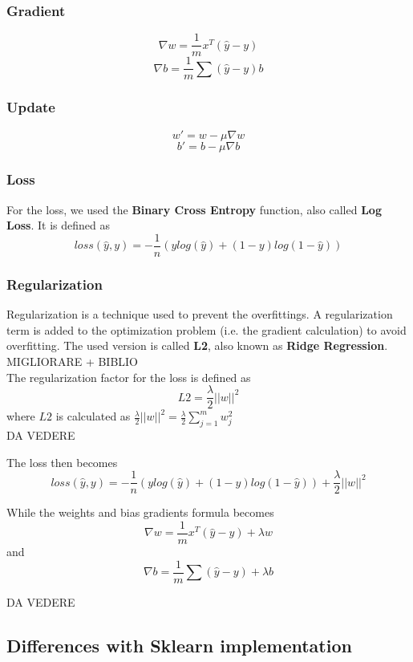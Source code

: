 \documentclass[
	letterpaper, %
	10pt, %
]{class}
\begin{document}
\subsubsection{Gradient}

$$ \nabla w = \frac{1}{m}x^T(\hat{y} - y) $$
$$\nabla b = \frac{1}{m}\sum(\hat{y} - y) b $$

\subsubsection{Update}


$$ w' = w - \mu \nabla w $$
$$ b' = b - \mu \nabla b $$

\subsubsection{Loss}
For the loss, we used the \textbf{Binary Cross Entropy} function, also called \textbf{Log Loss}.
It is defined as
$$ loss(\hat{y}, y) = -\frac{1}{n}(y log(\hat{y}) + (1-y)log(1-\hat{y})) $$

\subsubsection{Regularization}
Regularization is a technique used to prevent the overfittings. A regularization term is added to the optimization problem (i.e. the gradient calculation) to avoid overfitting.
The used version is called \textbf{L2}, also known as \textbf{Ridge Regression}. MIGLIORARE + BIBLIO\\

The regularization factor for the loss is defined as
$$ L2 = \frac{\lambda}{2}||w||^2 $$
where $L2$ is calculated as $ \frac{\lambda}{2}||w||^2 = \frac{\lambda}2{\displaystyle\sum_{j=1}^m w_j^2} $ \\
DA VEDERE

The loss then becomes
$$ loss(\hat{y}, y) = -\frac{1}{n}(y log(\hat{y}) + (1-y)log(1-\hat{y})) + \frac{\lambda}{2}||w||^2 $$

While the weights and bias gradients formula becomes
$$ \nabla w = \frac{1}{m}x^T(\hat{y} - y) + \lambda w $$
and
$$ \nabla b = \frac{1}{m}\sum(\hat{y} - y) + \lambda b$$

DA VEDERE

\subsection{Differences with Sklearn implementation}
\end{document}
